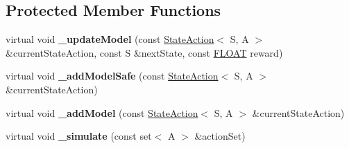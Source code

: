 \subsection*{Protected Member Functions}
\begin{DoxyCompactItemize}
\item 
\hypertarget{classAI_1_1Algorithm_1_1DynaQBase_a4a45b9303a4b9e0cf93b9a5272739b35}{virtual void {\bfseries \-\_\-update\-Model} (const \hyperlink{classAI_1_1StateAction}{State\-Action}$<$ S, A $>$ \&current\-State\-Action, const S \&next\-State, const \hyperlink{namespaceAI_a41b74884a20833db653dded3918e05c3}{F\-L\-O\-A\-T} reward)}\label{classAI_1_1Algorithm_1_1DynaQBase_a4a45b9303a4b9e0cf93b9a5272739b35}

\item 
\hypertarget{classAI_1_1Algorithm_1_1DynaQBase_a0524b63604a75fd079b85a3a6e6ac93d}{virtual void {\bfseries \-\_\-add\-Model\-Safe} (const \hyperlink{classAI_1_1StateAction}{State\-Action}$<$ S, A $>$ \&current\-State\-Action)}\label{classAI_1_1Algorithm_1_1DynaQBase_a0524b63604a75fd079b85a3a6e6ac93d}

\item 
\hypertarget{classAI_1_1Algorithm_1_1DynaQBase_aefe879b3103a6c4f46176d9fcb1a911d}{virtual void {\bfseries \-\_\-add\-Model} (const \hyperlink{classAI_1_1StateAction}{State\-Action}$<$ S, A $>$ \&current\-State\-Action)}\label{classAI_1_1Algorithm_1_1DynaQBase_aefe879b3103a6c4f46176d9fcb1a911d}

\item 
\hypertarget{classAI_1_1Algorithm_1_1DynaQBase_ae33343ea87f96ee3a2c2651bfd2cbcc5}{virtual void {\bfseries \-\_\-simulate} (const set$<$ A $>$ \&action\-Set)}\label{classAI_1_1Algorithm_1_1DynaQBase_ae33343ea87f96ee3a2c2651bfd2cbcc5}

\end{DoxyCompactItemize}
